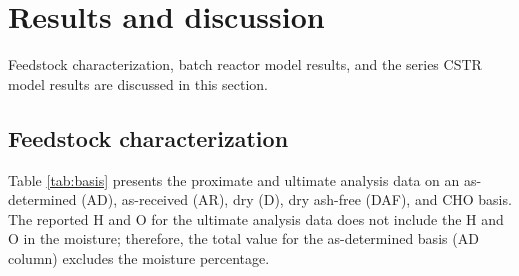 
\section{Results and discussion}

Feedstock characterization, batch reactor model results, and the series CSTR model results are discussed in this section.

\subsection{Feedstock characterization}

Table \ref{tab:basis} presents the proximate and ultimate analysis data on an as-determined (AD), as-received (AR), dry (D), dry ash-free (DAF), and CHO basis. The reported H and O for the ultimate analysis data does not include the H and O in the moisture; therefore, the total value for the as-determined basis (AD column) excludes the moisture percentage.

